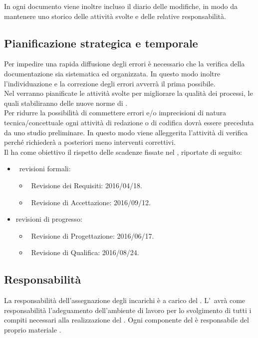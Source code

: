 		In ogni documento viene inoltre incluso il diario delle modifiche, in modo da mantenere uno storico delle attività svolte e delle relative responsabilità.
	\subsection{Pianificazione strategica e temporale}
		Per impedire una rapida diffusione degli errori è necessario che la verifica della documentazione sia sistematica ed organizzata. In questo modo inoltre l'individuazione e la correzione degli errori avverrà il prima possibile. \\
		Nel \PPdoc verranno pianificate le attività svolte per migliorare la qualità dei processi, le quali stabiliranno delle nuove norme di . \\
		Per ridurre la possibilità di commettere errori e/o imprecisioni di natura tecnica/concettuale ogni attività di redazione o di codifica dovrà essere preceduta da uno studio preliminare. In questo modo viene alleggerita l'attività di verifica perché richiederà a posteriori meno interventi correttivi. \\
		Il  ha come obiettivo il rispetto delle scadenze fissate nel \PPdoc, riportate di seguito:
		\begin{itemize}
			\item\ revisioni formali:
			\begin{itemize}
				\item\ Revisione dei Requisiti: 2016/04/18.
				\item\ Revisione di Accettazione: 2016/09/12.
			\end{itemize}
			\item revisioni di progresso:
			\begin{itemize}
				\item\ Revisione di Progettazione: 2016/06/17.
				\item\ Revisione di Qualifica: 2016/08/24.
			\end{itemize}
		\end{itemize}
	\subsection{Responsabilità}
		La responsabilità dell'assegnazione degli incarichi è a carico del \RES. L'\AM\ avrà come responsabilità l'adeguamento dell'ambiente di lavoro per lo svolgimento di tutti i compiti necessari alla realizzazione del . Ogni componente del  è responsabile del proprio materiale .
